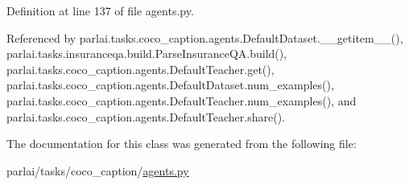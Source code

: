 Definition at line 137 of file agents.\+py.



Referenced by parlai.\+tasks.\+coco\+\_\+caption.\+agents.\+Default\+Dataset.\+\_\+\+\_\+getitem\+\_\+\+\_\+(), parlai.\+tasks.\+insuranceqa.\+build.\+Parse\+Insurance\+Q\+A.\+build(), parlai.\+tasks.\+coco\+\_\+caption.\+agents.\+Default\+Teacher.\+get(), parlai.\+tasks.\+coco\+\_\+caption.\+agents.\+Default\+Dataset.\+num\+\_\+examples(), parlai.\+tasks.\+coco\+\_\+caption.\+agents.\+Default\+Teacher.\+num\+\_\+examples(), and parlai.\+tasks.\+coco\+\_\+caption.\+agents.\+Default\+Teacher.\+share().



The documentation for this class was generated from the following file\+:\begin{DoxyCompactItemize}
\item 
parlai/tasks/coco\+\_\+caption/\hyperlink{parlai_2tasks_2coco__caption_2agents_8py}{agents.\+py}\end{DoxyCompactItemize}
